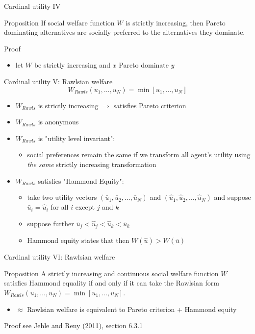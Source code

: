 \documentclass[bigger]{beamer}
\begin{document}
\begin{frame}[label={sec:org9f2a716}]{Cardinal utility IV}
\begin{block}{Proposition}
If social welfare function \(W\) is strictly increasing, then Pareto dominating alternatives are socially preferred to the alternatives they dominate.
\end{block}
\begin{block}{Proof}
\begin{itemize}
\item let \(W\) be strictly increasing and \(x\) Pareto dominate \(y\)
\end{itemize}

\vspace*{2cm}
\end{block}
\end{frame}

\begin{frame}[label={sec:org073a6de}]{Cardinal utility V: Rawlsian welfare}
$$W_{Rawls}(u_1,\dots,u_N)=\min[u_1,\dots,u_N]$$

\begin{itemize}
\item \(W_{Rawls}\) is strictly increasing \(\Rightarrow\) satisfies Pareto criterion
\item \(W_{Rawls}\) is anonymous
\item \(W_{Rawls}\) is "utility level invariant":
\begin{itemize}
\item social preferences remain the same if we transform all agent's utility using \emph{the same} strictly increasing transformation
\end{itemize}
\item \(W_{Rawls}\) satisfies "Hammond Equity":
\begin{itemize}
\item take two utility vectors \((\bar u_1,\bar u_2,\dots,\bar u_N)\) and \((\hat u_1,\hat u_2,\dots,\hat u_N)\) and suppose \(\bar u_i=\hat u_i\) for all \(i\) except \(j\) and \(k\)
\item suppose further \(\bar u_j<\hat u_j<\hat u_k<\bar u_k\)
\item Hammond equity states that then \(W(\hat u)> W(\bar u)\)
\end{itemize}
\end{itemize}
\end{frame}
\begin{frame}[label={sec:org99671b7}]{Cardinal utility VI: Rawlsian welfare}
\begin{block}{Proposition}
A strictly increasing and continuous social welfare function \(W\) satisfies Hammond equality if and only if it can take the Rawlsian form \(W_{Rawls}(u_1,\dots,u_N)=\min[u_1,\dots,u_N]\).
\end{block}
\begin{itemize}
\item \(\approx\) Rawlsian welfare is equivalent to Pareto criterion  + Hammond equity
\end{itemize}
\begin{block}{Proof}
see Jehle and Reny (2011), section 6.3.1
\end{block}
\end{frame}
\end{document}
